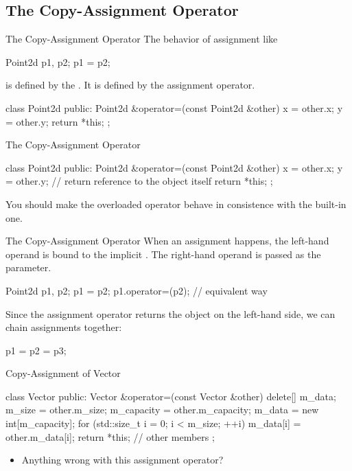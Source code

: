 \documentclass{beamer}
\begin{document}
\subsection{The Copy-Assignment Operator}

\begin{frame}[fragile]{The Copy-Assignment Operator}
    The behavior of assignment like
    \begin{cpp}
Point2d p1, p2;
p1 = p2;
    \end{cpp}
    is defined by the . It is defined by  the assignment operator.
    \begin{cpp}
class Point2d {
 public:
  Point2d &operator=(const Point2d &other) {
    x = other.x;
    y = other.y;
    return *this;
  }
};
    \end{cpp}
\end{frame}

\begin{frame}[fragile]{The Copy-Assignment Operator}
    \begin{cpp}
class Point2d {
 public:
  Point2d &operator=(const Point2d &other) {
    x = other.x;
    y = other.y;
    // return reference to the object itself
    return *this;
  }
};
    \end{cpp}
    \begin{notice}
        You should make the overloaded operator behave in consistence with the built-in one.
    \end{notice}
\end{frame}

\begin{frame}[fragile]{The Copy-Assignment Operator}
    When an assignment happens, the left-hand operand is bound to the implicit . The right-hand operand is passed as the parameter.
    \begin{cpp}
Point2d p1, p2;
p1 = p2;
p1.operator=(p2); // equivalent way
    \end{cpp}
    \pause
    Since the assignment operator returns the object on the left-hand side, we can chain assignments together:
    \begin{cpp}
p1 = p2 = p3;
    \end{cpp}
\end{frame}

\begin{frame}[fragile]{Copy-Assignment of Vector}
    \begin{cpp}
class Vector {
 public:
  Vector &operator=(const Vector &other) {
    delete[] m_data;
    m_size = other.m_size;
    m_capacity = other.m_capacity;
    m_data = new int[m_capacity];
    for (std::size_t i = 0; i < m_size; ++i)
      m_data[i] = other.m_data[i];
    return *this;
  }
  // other members
};
    \end{cpp}
    \pause
    \begin{itemize}
        \item Anything wrong with this assignment operator?
    \end{itemize}
\end{frame}
\end{document}
